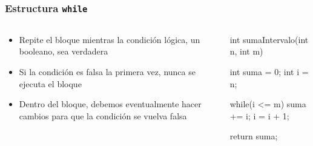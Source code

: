 \documentclass{beamer}
\begin{document}
\begin{frame}[fragile]
  \frametitle{Estructura \texttt{while}}

  \begin{columns}
    \begin{column}{0.4\textwidth}
      \begin{itemize}
      \item Repite el bloque mientras la condición lógica, un
        booleano, sea verdadera
        
      \item Si la condición es falsa la primera vez, nunca se
        ejecuta el bloque
        
      \item Dentro del bloque, debemos eventualmente hacer cambios
        para que la condición se vuelva falsa

      \end{itemize}      
    \end{column}
    \begin{column}{0.6\textwidth}
\begin{jsmall}
        int sumaIntervalo(int n, int m) {
          int suma = 0;
          int i = n;

          while(i <= m) {
            suma += i;
            i = i + 1;            
          }

          return suma;
        }
\end{jsmall}
    \end{column}
  \end{columns}

\end{frame}
\end{document}
